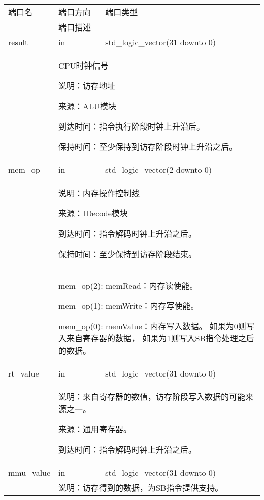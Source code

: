         \begin{tabularx}{\textwidth}{lll}
            \toprule
            端口名      & 端口方向  & 端口类型 \\
            \cmidrule(l){2-3}
            &
            \multicolumn{2}{X}{端口描述} \\
            \midrule
            result      & in   & std\_logic\_vector(31 downto 0) \\
            \cmidrule(l){2-3}
            &
            \multicolumn{2}{X}{
                CPU时钟信号

                说明：访存地址                                         

                来源：ALU模块

                到达时间：指令执行阶段时钟上升沿后。

                保持时间：至少保持到访存阶段时钟上升沿之后。
            } \\
            \midrule
            mem\_op      & in    & std\_logic\_vector(2 downto 0) \\
            \cmidrule(l){2-3}
            &
            \multicolumn{2}{X}{
                说明：内存操作控制线

                来源：IDecode模块
                
                到达时间：指令解码时钟上升沿之后。

                保持时间：至少保持到访存阶段结束。
            } \\
            &
            \multicolumn{2}{X}{
                mem\_op(2): memRead：内存读使能。

                mem\_op(1): memWrite：内存写使能。

                mem\_op(0): memValue：内存写入数据。
                如果为0则写入来自寄存器的数据，%
                如果为1则写入SB指令处理之后的数据。
            } \\
            \midrule
            rt\_value   & in    & std\_logic\_vector(31 downto 0) \\
            \cmidrule(l){2-3}
            &
            \multicolumn{2}{X}{
                说明：来自寄存器的数值，访存阶段写入数据的可能来源之一。

                来源：通用寄存器。

                到达时间：指令解码时钟上升沿之后。
            } \\
            \midrule
            mmu\_value  & in    & std\_logic\_vector(31 downto 0) \\
            \cmidrule(l){2-3}
            &
            \multicolumn{2}{X}{
                说明：访存得到的数据，为SB指令提供支持。

}
\end{tabularx}
